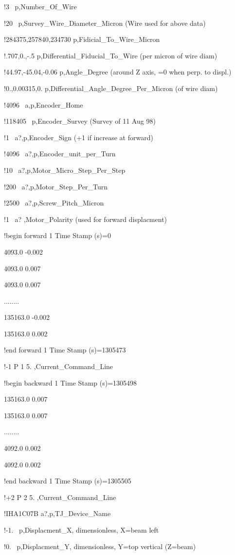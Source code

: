 !3 ~p,Number\_Of\_Wire 

!20 ~p,Survey\_Wire\_Diameter\_Micron (Wire used for above data) 

!284375,257840,234730 p,Fidicial\_To\_Wire\_Micron 

!.707,0.,-.5 p,Differential\_Fiducial\_To\_Wire (per micron of wire diam) 

!44.97,-45.04,-0.06 p,Angle\_Degree (around Z axis, =0 when perp. to displ.) 

!0.,0.00315,0. p,Differential\_Angle\_Degree\_Per\_Micron (of wire diam) 

!4096 ~a,p,Encoder\_Home 

!118405 ~p,Encoder\_Survey (Survey of 11 Aug 98) 

!1 ~a?,p,Encoder\_Sign (+1 if increase at forward) 

!4096 ~a?,p,Encoder\_unit\_per\_Turn 

!10 ~a?,p,Motor\_Micro\_Step\_Per\_Step 

!200 ~a?,p,Motor\_Step\_Per\_Turn 

!2500 ~a?,p,Screw\_Pitch\_Micron 

!1 ~a? ,Motor\_Polarity (used for forward displacment) 

!begin forward 1 Time Stamp (s)=0 

4093.0 -0.002 

4093.0 0.007 

4093.0 0.007 

........ 

135163.0 -0.002 

135163.0 0.002 

!end forward 1 Time Stamp (s)=1305473 

!-1 P 1 5. ,Current\_Command\_Line 

!begin backward 1 Time Stamp (s)=1305498 

135163.0 0.007 

135163.0 0.007 

........ 

4092.0 0.002 

4092.0 0.002 

!end backward 1 Time Stamp (s)=1305505 

!+2 P 2 5. ,Current\_Command\_Line 

!IHA1C07B a?,p,TJ\_Device\_Name 

!-1. ~p,Displacment\_X, dimensionless, X=beam left 

!0. ~p,Displacment\_Y, dimensionless, Y=top vertical (Z=beam) 

